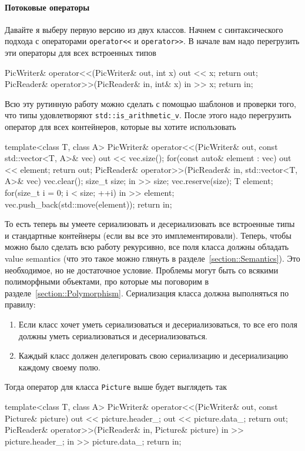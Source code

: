 \paragraph{Потоковые операторы}
Давайте я выберу первую версию из двух классов.
Начнем с синтаксического подхода с операторами \verb"operator<<" и \verb"operator>>".
В начале вам надо перегрузить эти операторы для всех встроенных типов
\begin{cppcode}
PicWriter& operator<<(PicWriter& out, int x) {
  out << x;
  return out;
}
PicReader& operator>>(PicReader& in, int& x) {
  in >> x;
  return in;
}
\end{cppcode}
Всю эту рутинную работу можно сделать с помощью шаблонов и проверки того, что типы удовлетворяют \verb"std::is_arithmetic_v".
После этого надо перегрузить оператор для всех контейнеров, которые вы хотите использовать
\begin{cppcode}
template<class T, class A>
PicWriter& operator<<(PicWriter& out, const std::vector<T, A>& vec) {
  out << vec.size();
  for(const auto& element : vec)
    out << element;
  return out;
}
PicReader& operator>>(PicReader& in, std::vector<T, A>& vec) {
  vec.clear();
  size_t size;
  in >> size;
  vec.reserve(size);
  T element;
  for(size_t i = 0; i < size; ++i) {
    in >> element;
    vec.push_back(std::move(element));
  }
  return in;
}
\end{cppcode}
То есть теперь вы умеете сериализовать и десериализовать все встроенные типы и стандартные контейнеры (если вы все это имплементировали).
Теперь, чтобы можно было сделать всю работу рекурсивно, все поля класса должны обладать value semantics (что это такое можно глянуть в разделе~\ref{section::Semantics}).
Это необходимое, но не достаточное условие.
Проблемы могут быть со всякими полиморфными объектами, про которые мы поговорим в разделе~\ref{section::Polymorphism}.
Сериализация класса должна выполняться по правилу:
\begin{enumerate}
\item Если класс хочет уметь сериализоваться и десериализоваться, то все его поля должны уметь сериализоваться и десериализоваться.

\item Каждый класс должен делегировать свою сериализацию и десериализацию каждому своему полю.
\end{enumerate}
Тогда оператор для класса \verb"Picture" выше будет выглядеть так
\begin{cppcode}
template<class T, class A>
PicWriter& operator<<(PicWriter& out, const Picture& picture) {
  out << picture.header_;
  out << picture.data_;
  return out;
}
PicReader& operator>>(PicReader& in, Picture& picture) {
  in >> picture.header_;
  in >> picture.data_;
  return in;
}
\end{cppcode}
